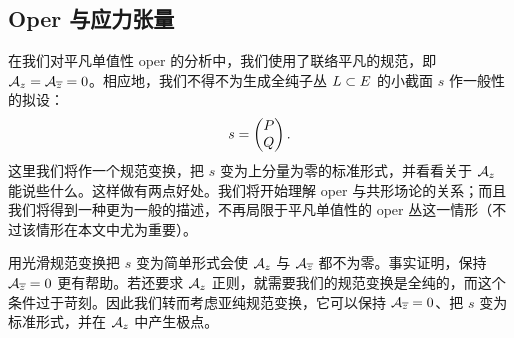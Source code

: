 \subsection{Oper 与应力张量}\label{opstress}

在我们对平凡单值性 oper 的分析中，我们使用了联络平凡的规范，即 ${\mathcal A}_z={\mathcal A}_{\overline z}=0$。相应地，我们不得不为生成全纯子丛 ${ L}\subset E$ 的小截面 $s$ 作一般性的拟设：
\begin{equation}\label{poxo} s=\begin{pmatrix}P\cr Q\end{pmatrix}.\end{equation}
这里我们将作一个规范变换，把 $s$ 变为上分量为零的标准形式，并看看关于 ${\mathcal A}_z$ 能说些什么。这样做有两点好处。我们将开始理解 oper 与共形场论的关系；而且我们将得到一种更为一般的描述，不再局限于平凡单值性的 oper 丛这一情形（不过该情形在本文中尤为重要）。

用光滑规范变换把 $s$ 变为简单形式会使 ${\mathcal A}_z$ 与 ${\mathcal A}_{\overline z}$ 都不为零。事实证明，保持 ${\mathcal A}_{\overline z}=0$ 更有帮助。若还要求 ${\mathcal A}_z$ 正则，就需要我们的规范变换是全纯的，而这个条件过于苛刻。因此我们转而考虑亚纯规范变换，它可以保持 ${\mathcal A}_{\overline z}=0$、把 $s$ 变为标准形式，并在 ${\mathcal A}_z$ 中产生极点。

